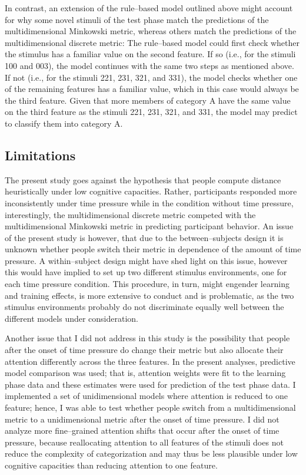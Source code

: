 \documentclass[a4paper,man,natbib]{apa6}
\begin{document}
In contrast, an extension of the rule--based model outlined above might account for why some novel stimuli of the test phase match the predictions of the multidimensional Minkowski metric, whereas others match the predictions of the multidimensional discrete metric: The rule--based model could first check whether the stimulus has a familiar value on the second feature. If so (i.e., for the stimuli 100 and 003), the model continues with the same two steps as mentioned above. If not (i.e., for the stimuli 221, 231, 321, and 331), the model checks whether one of the remaining features has a familiar value, which in this case would always be the third feature. Given that more members of category A have the same value on the third feature as the stimuli 221, 231, 321, and 331, the model may predict to classify them into category A. 

\subsection{Limitations}
The present study goes against the hypothesis that people compute distance heuristically under low cognitive capacities. Rather, participants responded more inconsistently under time pressure while in the condition without time pressure, interestingly, the multidimensional discrete metric competed with the multidimensional Minkowski metric in predicting participant behavior. An issue of the present study is however, that due to the between--subjects design it is unknown whether people switch their metric in dependence of the amount of time pressure. A within--subject design might have shed light on this issue, however this would have implied to set up two different stimulus environments, one for each time pressure condition. This procedure, in turn, might engender learning and training effects, is more extensive to conduct and is problematic, as the two stimulus environments probably do not discriminate equally well between the different models under consideration.

Another issue that I did not address in this study is the possibility that people after the onset of time pressure do change their metric but also allocate their attention differently across the three features. In the present analyses, predictive model comparison was used; that is, attention weights were fit to the learning phase data and these estimates were used for prediction of the test phase data. I implemented a set of unidimensional models where attention is reduced to one feature; hence, I was able to test whether people switch from a multidimensional metric to a unidimensional metric after the onset of time pressure. I did not analyze more fine--grained attention shifts that occur after the onset of time pressure, because reallocating attention to all features of the stimuli does not reduce the complexity of categorization and may thus be less plausible under low cognitive capacities than reducing attention to one feature. 
\end{document}
